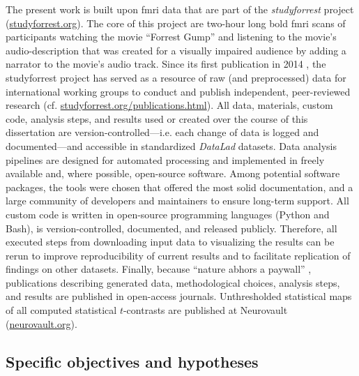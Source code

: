 %
The present work is built upon \ac{fmri} data that are part of the
\textit{studyforrest} project
(\href{www.studyforrest.org}{\url{studyforrest.org}}).
The core of this project are two-hour long \ac{bold} \ac{fmri} scans of
participants watching the movie ``Forrest Gump'' \citep{ForrestGumpMovie} and
listening to the movie's audio-description that was created for a visually
impaired audience by adding a narrator to the movie's audio track.
Since its first publication in 2014 \citep{hanke2014audiomovie}, the
studyforrest project has served as a resource of raw (and preprocessed) data for
international working groups to conduct and publish independent, peer-reviewed
research (cf.
\href{www.studyforrest.org/publications.html}{\url{studyforrest.org/publications.html}}).
All data, materials, custom code, analysis steps, and results used or created
over the course of this dissertation are version-controlled---i.e. each change
of data is logged and documented---and accessible in standardized
\textit{DataLad}
\citep[\href{www.datalad.org}{\url{datalad.org}};][]{halchenko2021datalad}
datasets.
Data analysis pipelines are designed for automated processing and implemented in
freely available and, where possible, open-source software.
Among potential software packages, the tools were chosen that offered the most
solid documentation, and a large community of developers and maintainers to
ensure long-term support.
All custom code is written in open-source programming languages (Python and
Bash), is version-controlled, documented, and released publicly.
Therefore, all executed steps from downloading input data to visualizing the
results can be rerun to improve reproducibility of current results and to
facilitate replication of findings on other datasets.
Finally, because ``nature abhors a paywall'' \citep{dupre2020nature},
publications describing generated data, methodological choices, analysis steps,
and results are published in open-access journals.
Unthresholded statistical maps of all computed statistical $t$-contrasts are
published at Neurovault (\href{https://neurovault.org/}{\url{neurovault.org}}).



\subsection{Specific objectives and hypotheses}


